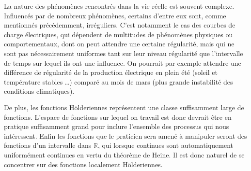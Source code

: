 
La nature des phénomènes rencontrés dans la vie réelle est souvent complexe. Influencés par de nombreux phénomènes, certains d'entre eux sont, comme mentionnés précédemment, irréguliers. C'est notamment le cas des courbes de charge électriques, qui dépendent de multitudes de phénomènes physiques ou comportementaux, dont on peut attendre une certaine régularité, mais qui ne sont pas nécessairement uniformes tant sur leur niveau régularité que l'intervalle de temps sur lequel ils ont une influence. On pourrait par exemple attendre une différence de régularité de la production électrique en plein été (soleil et température stables \ldots) comparé au mois de mars (plus grande instabilité des conditions climatiques).

De plus, les fonctions Hölderiennes représentent une classe suffisamment large de fonctions.  L'espace de fonctions sur lequel on travail est donc devrait être en pratique suffisamment grand pour inclure l'ensemble des processus qui nous intéressent. Enfin les fonctions que le praticien sera amené à manipuler seront des fonctions d'un intervalle dans $\mathds R$, qui lorsque continues sont automatiquement uniformément continues en vertu du théorème de Heine. Il est donc naturel de se concentrer sur des fonctions localement Hölderiennes.